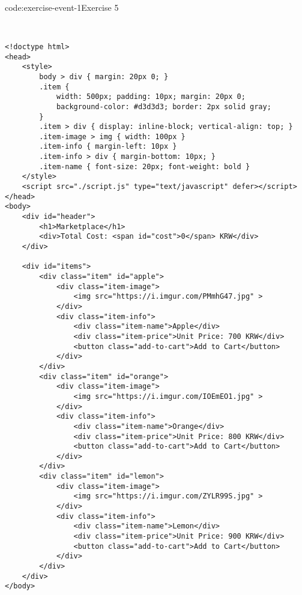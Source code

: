\begin{codeenv}{code:exercise-event-1}{Exercise 5}\begin{verbatim}


<!doctype html>
<head>
    <style>
        body > div { margin: 20px 0; }
        .item { 
            width: 500px; padding: 10px; margin: 20px 0; 
            background-color: #d3d3d3; border: 2px solid gray;
        }
        .item > div { display: inline-block; vertical-align: top; }
        .item-image > img { width: 100px }
        .item-info { margin-left: 10px }
        .item-info > div { margin-bottom: 10px; }
        .item-name { font-size: 20px; font-weight: bold }
    </style>
    <script src="./script.js" type="text/javascript" defer></script>
</head>
<body>
    <div id="header">
        <h1>Marketplace</h1>
        <div>Total Cost: <span id="cost">0</span> KRW</div>
    </div>

    <div id="items">
        <div class="item" id="apple">
            <div class="item-image">
                <img src="https://i.imgur.com/PMmhG47.jpg" >
            </div>
            <div class="item-info">
                <div class="item-name">Apple</div>
                <div class="item-price">Unit Price: 700 KRW</div>
                <button class="add-to-cart">Add to Cart</button>
            </div>
        </div>
        <div class="item" id="orange">
            <div class="item-image">
                <img src="https://i.imgur.com/IOEmEO1.jpg" >
            </div>
            <div class="item-info">
                <div class="item-name">Orange</div>
                <div class="item-price">Unit Price: 800 KRW</div>
                <button class="add-to-cart">Add to Cart</button>
            </div>
        </div>
        <div class="item" id="lemon">
            <div class="item-image">
                <img src="https://i.imgur.com/ZYLR99S.jpg" >
            </div>
            <div class="item-info">
                <div class="item-name">Lemon</div>
                <div class="item-price">Unit Price: 900 KRW</div>
                <button class="add-to-cart">Add to Cart</button>
            </div>
        </div>
    </div>
</body>
\end{verbatim}
\end{codeenv}

